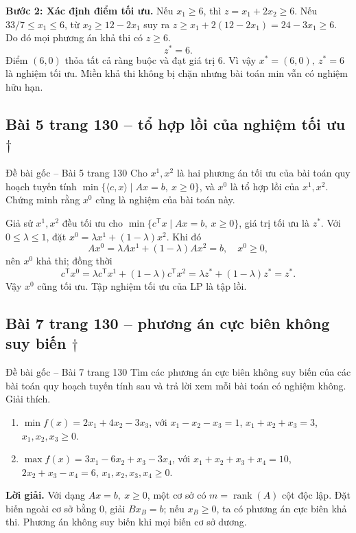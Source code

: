 \documentclass[11pt,a4paper]{article}
\newcommand{\T}{^{\mathsf T}}
\begin{document}
\textbf{Bước 2: Xác định điểm tối ưu.} Nếu \(x_1\ge6\), thì \(z=x_1+2x_2\ge6\). Nếu \(33/7\le x_1\le6\), từ \(x_2\ge12-2x_1\) suy ra \(z\ge x_1+2(12-2x_1)=24-3x_1\ge6\). Do đó mọi phương án khả thi có \(z\ge6\).
\[
z^*=6.
\]
Điểm \((6,0)\) thỏa tất cả ràng buộc và đạt giá trị \(6\). Vì vậy \(\boxed{x^\ast=(6,0),\ z^\ast=6}\) là nghiệm tối ưu. Miền khả thi không bị chặn nhưng bài toán min vẫn có nghiệm hữu hạn.

\subsection{Bài 5 trang 130 -- tổ hợp lồi của nghiệm tối ưu \(\dagger\)}
\begin{questionbox}{Đề bài gốc -- Bài 5 trang 130}
Cho \(x^1,x^2\) là hai phương án tối ưu của bài toán quy hoạch tuyến tính \(\min\{\langle c,x\rangle\mid Ax=b,\ x\ge0\}\), và \(x^0\) là tổ hợp lồi của \(x^1,x^2\). Chứng minh rằng \(x^0\) cũng là nghiệm của bài toán này.
\end{questionbox}
Giả sử \(x^1,x^2\) đều tối ưu cho \(\min\{c\T x\mid Ax=b,\ x\ge0\}\), giá trị tối ưu là \(z^\ast\). Với \(0\le\lambda\le1\), đặt \(x^0=\lambda x^1+(1-\lambda)x^2\). Khi đó
\[
Ax^0=\lambda Ax^1+(1-\lambda)Ax^2=b,\quad x^0\ge0,
\]
nên \(x^0\) khả thi; đồng thời
\[
c\T x^0=\lambda c\T x^1+(1-\lambda)c\T x^2
=\lambda z^\ast+(1-\lambda)z^\ast=z^\ast.
\]
Vậy \(x^0\) cũng tối ưu. Tập nghiệm tối ưu của LP là tập lồi.

\subsection{Bài 7 trang 130 -- phương án cực biên không suy biến \(\dagger\)}
\begin{questionbox}{Đề bài gốc -- Bài 7 trang 130}
Tìm các phương án cực biên không suy biến của các bài toán quy hoạch tuyến tính sau và trả lời xem mỗi bài toán có nghiệm không. Giải thích.
\begin{enumerate}[label=\roman*),nosep,leftmargin=*]
\item \(\min f(x)=2x_1+4x_2-3x_3\), với \(x_1-x_2-x_3=1\), \(x_1+x_2+x_3=3\), \(x_1,x_2,x_3\ge0\).
\item \(\max f(x)=3x_1-6x_2+x_3-3x_4\), với \(x_1+x_2+x_3+x_4=10\), \(2x_2+x_3-x_4=6\), \(x_1,x_2,x_3,x_4\ge0\).
\end{enumerate}
\end{questionbox}
\textbf{Lời giải.} Với dạng \(Ax=b,\ x\ge0\), một cơ sở có \(m=\operatorname{rank}(A)\) cột độc lập. Đặt biến ngoài cơ sở bằng \(0\), giải \(Bx_B=b\); nếu \(x_B\ge0\), ta có phương án cực biên khả thi. Phương án không suy biến khi mọi biến cơ sở dương.
\end{document}
